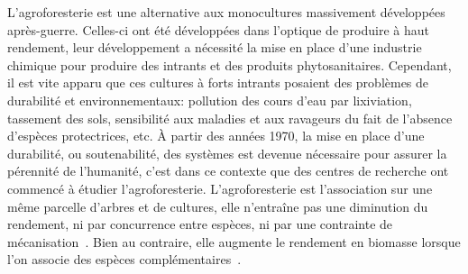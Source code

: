 \documentclass[12pt]{report}
\begin{document}
L'agroforesterie est une alternative aux monocultures massivement développées
après-guerre. Celles-ci ont été développées dans l'optique de produire à
haut rendement, leur développement a nécessité la mise en place d'une
industrie chimique pour produire des intrants et des produits phytosanitaires.
Cependant, il est vite apparu que ces cultures à forts intrants posaient des
problèmes de durabilité et environnementaux: pollution des cours d'eau par
lixiviation, tassement des sols, sensibilité aux maladies et aux
ravageurs du fait de l'absence d'espèces protectrices, etc. À partir des années
1970, la mise en place d'une durabilité, ou soutenabilité, des systèmes est devenue
nécessaire pour assurer la pérennité de l'humanité, c'est dans ce contexte que des
centres de recherche ont commencé à étudier l'agroforesterie.
L'agroforesterie est l'association sur une même parcelle d'arbres et de cultures,
elle n'entraîne pas une diminution du rendement, ni par concurrence entre espèces,
ni par une contrainte de mécanisation~\citep{AF_ref50}. Bien au contraire, elle
augmente le rendement en biomasse lorsque l'on associe des espèces
complémentaires~\citep{AF_ref51}.
\end{document}
